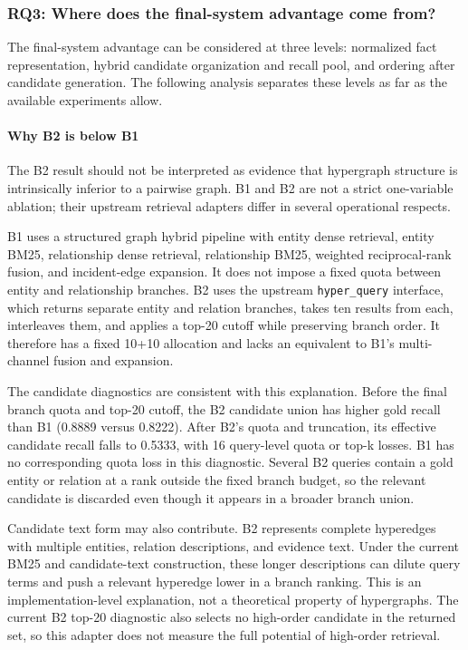 \subsubsection{RQ3: Where does the final-system advantage come from?}

The final-system advantage can be considered at three levels: normalized fact representation, hybrid candidate organization and recall pool, and ordering after candidate generation. The following analysis separates these levels as far as the available experiments allow.

\paragraph{Why B2 is below B1}

The B2 result should not be interpreted as evidence that hypergraph structure is intrinsically inferior to a pairwise graph. B1 and B2 are not a strict one-variable ablation; their upstream retrieval adapters differ in several operational respects.

B1 uses a structured graph hybrid pipeline with entity dense retrieval, entity BM25, relationship dense retrieval, relationship BM25, weighted reciprocal-rank fusion, and incident-edge expansion. It does not impose a fixed quota between entity and relationship branches. B2 uses the upstream \texttt{hyper\_query} interface, which returns separate entity and relation branches, takes ten results from each, interleaves them, and applies a top-20 cutoff while preserving branch order. It therefore has a fixed 10+10 allocation and lacks an equivalent to B1's multi-channel fusion and expansion.

The candidate diagnostics are consistent with this explanation. Before the final branch quota and top-20 cutoff, the B2 candidate union has higher gold recall than B1 (0.8889 versus 0.8222). After B2's quota and truncation, its effective candidate recall falls to 0.5333, with 16 query-level quota or top-k losses. B1 has no corresponding quota loss in this diagnostic. Several B2 queries contain a gold entity or relation at a rank outside the fixed branch budget, so the relevant candidate is discarded even though it appears in a broader branch union.

Candidate text form may also contribute. B2 represents complete hyperedges with multiple entities, relation descriptions, and evidence text. Under the current BM25 and candidate-text construction, these longer descriptions can dilute query terms and push a relevant hyperedge lower in a branch ranking. This is an implementation-level explanation, not a theoretical property of hypergraphs. The current B2 top-20 diagnostic also selects no high-order candidate in the returned set, so this adapter does not measure the full potential of high-order retrieval.

